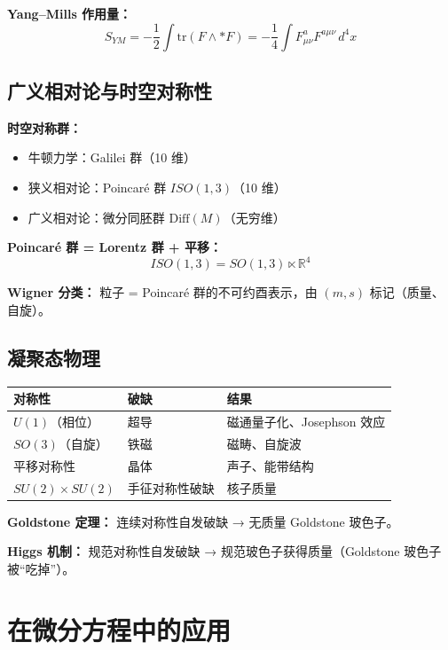 \textbf{Yang--Mills 作用量：}
\[
S_{YM} = -\frac{1}{2}\int \text{tr}(F \wedge *F) = -\frac{1}{4}\int F_{\mu\nu}^a F^{a\mu\nu}\,d^4x
\]

\subsection{广义相对论与时空对称性}

\textbf{时空对称群：}
\begin{itemize}
  \item 牛顿力学：Galilei 群（10 维）
  \item 狭义相对论：Poincaré 群 $ISO(1,3)$（10 维）
  \item 广义相对论：微分同胚群 $\text{Diff}(M)$（无穷维）
\end{itemize}

\textbf{Poincaré 群 = Lorentz 群 + 平移：}
\[
ISO(1,3) = SO(1,3) \ltimes \mathbb{R}^4
\]

\textbf{Wigner 分类：} 粒子 = Poincaré 群的不可约酉表示，由 $(m, s)$ 标记（质量、自旋）。

\subsection{凝聚态物理}

\begin{center}
\begin{tabular}{L{4cm}L{4cm}L{4cm}}
\toprule
\textbf{对称性} & \textbf{破缺} & \textbf{结果} \\
\midrule
$U(1)$（相位） & 超导 & 磁通量子化、Josephson 效应 \\
$SO(3)$（自旋） & 铁磁 & 磁畴、自旋波 \\
平移对称性 & 晶体 & 声子、能带结构 \\
$SU(2) \times SU(2)$ & 手征对称性破缺 & 核子质量 \\
\bottomrule
\end{tabular}
\end{center}

\textbf{Goldstone 定理：} 连续对称性自发破缺 → 无质量 Goldstone 玻色子。

\textbf{Higgs 机制：} 规范对称性自发破缺 → 规范玻色子获得质量（Goldstone 玻色子被“吃掉”）。

\section{在微分方程中的应用}

